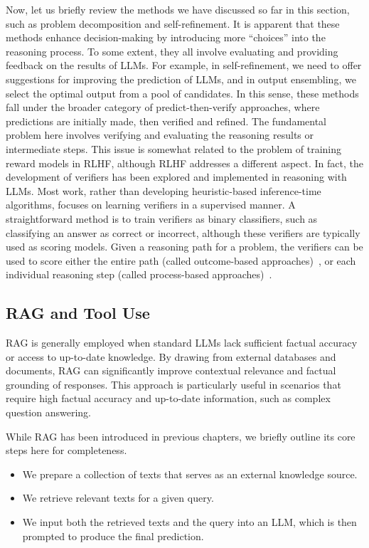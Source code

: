 Now, let us briefly review the methods we have discussed so far in this section, such as problem decomposition and self-refinement. It is apparent that these methods enhance decision-making by introducing more ``choices'' into the reasoning process. To some extent, they all involve evaluating and providing feedback on the results of LLMs. For example, in self-refinement, we need to offer suggestions for improving the prediction of LLMs, and in output ensembling, we select the optimal output from a pool of candidates. In this sense, these methods fall under the broader category of predict-then-verify approaches, where predictions are initially made, then verified and refined. The fundamental problem here involves verifying and evaluating the reasoning results or intermediate steps. This issue is somewhat related to the problem of training reward models in RLHF, although RLHF addresses a different aspect. In fact, the development of verifiers has been explored and implemented in reasoning with LLMs. Most work, rather than developing heuristic-based inference-time algorithms, focuses on learning verifiers in a supervised manner. A straightforward method is to train verifiers as binary classifiers, such as classifying an answer as correct or incorrect, although these verifiers are typically used as scoring models. Given a reasoning path for a problem, the verifiers can be used to score either the entire path (called outcome-based approaches)~\cite{cobbe-etal:2021training}, or each individual reasoning step (called process-based approaches)~\cite{uesato-etal:2022solving,lightman-etal:2024lets}.

\subsection{RAG and Tool Use}
\label{sec:rag-and-tool-use}

\noindent RAG is generally employed when standard LLMs lack sufficient factual accuracy or access to up-to-date knowledge. By drawing from external databases and documents, RAG can significantly improve contextual relevance and factual grounding of responses. This approach is particularly useful in scenarios that require high factual accuracy and up-to-date information, such as complex question answering.

While RAG has been introduced in previous chapters, we briefly outline its core steps here for completeness.

\begin{itemize}
\item \vspace{0.5em} We prepare a collection of texts that serves as an external knowledge source.
\item \vspace{0.3em} We retrieve relevant texts for a given query.
\item \vspace{0.3em} We input both the retrieved texts and the query into an LLM, which is then prompted to produce the final prediction.
\end{itemize}
\vspace{0.5em}

